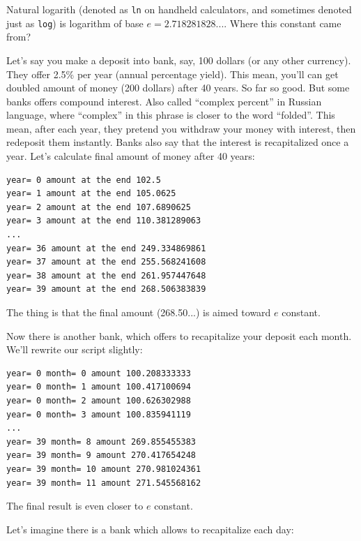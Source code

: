 
Natural logarith (denoted as \texttt{ln} on handheld calculators, and sometimes denoted just as \texttt{log})
is logarithm of base $e=2.718281828...$.
Where this constant came from?

\leveldown{}


Let's say you make a deposit into bank, say, 100 dollars (or any other currency).
They offer 2.5\% per year (annual percentage yield).
This mean, you'll can get doubled amount of money (200 dollars) after 40 years.
So far so good.
But some banks offers compound interest.
Also called ``complex percent'' in Russian language, where ``complex'' in this phrase is closer to the word ``folded''.
This mean, after each year, they pretend you withdraw your money with interest, then redeposit them instantly.
Banks also say that the interest is recapitalized once a year.
Let's calculate final amount of money after 40 years:



\begin{lstlisting}
year= 0 amount at the end 102.5
year= 1 amount at the end 105.0625
year= 2 amount at the end 107.6890625
year= 3 amount at the end 110.381289063
...
year= 36 amount at the end 249.334869861
year= 37 amount at the end 255.568241608
year= 38 amount at the end 261.957447648
year= 39 amount at the end 268.506383839
\end{lstlisting}

The thing is that the final amount (268.50...) is aimed toward $e$ constant.

Now there is another bank, which offers to recapitalize your deposit each month.
We'll rewrite our script slightly:



\begin{lstlisting}
year= 0 month= 0 amount 100.208333333
year= 0 month= 1 amount 100.417100694
year= 0 month= 2 amount 100.626302988
year= 0 month= 3 amount 100.835941119
...
year= 39 month= 8 amount 269.855455383
year= 39 month= 9 amount 270.417654248
year= 39 month= 10 amount 270.981024361
year= 39 month= 11 amount 271.545568162
\end{lstlisting}

The final result is even closer to $e$ constant.

Let's imagine there is a bank which allows to recapitalize each day:

